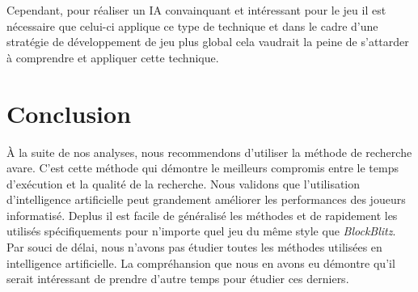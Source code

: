 \documentclass[12pt,english,frenchb,letterpaper]{article}
\begin{document}
Cependant, pour réaliser un IA convainquant et intéressant pour le jeu il est nécessaire que celui-ci applique ce type de technique et dans le cadre d'une stratégie de développement de jeu plus global cela vaudrait la peine de s'attarder à comprendre et appliquer cette technique.


\section{Conclusion}

À la suite de nos analyses, nous recommendons d'utiliser la méthode de recherche avare. C'est cette méthode qui démontre le meilleurs compromis entre le temps d'exécution et la qualité de la recherche. Nous validons que l'utilisation d'intelligence artificielle peut grandement améliorer les performances des joueurs informatisé. Deplus il est facile de généralisé les méthodes et de rapidement les utilisés spécifiquements pour n'importe quel jeu du même style que \textit{BlockBlitz}. Par souci de délai, nous n'avons pas étudier toutes les méthodes utilisées en intelligence artificielle. La compréhansion que nous en avons eu démontre qu'il serait intéressant de prendre d'autre temps pour étudier ces derniers.
\end{document}
